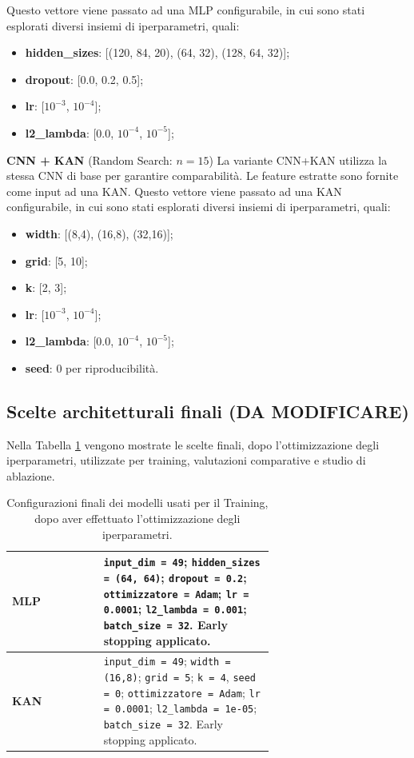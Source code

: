 \documentclass[a4paper,12pt]{report}
\begin{document}
	Questo vettore viene passato ad una MLP configurabile, in cui sono stati esplorati diversi insiemi di iperparametri, quali:  
	\begin{itemize}
		\item \textbf{hidden\_sizes}: [(120, 84, 20), (64, 32), (128, 64, 32)];
		\item \textbf{dropout}: [0.0, 0.2, 0.5];
		\item \textbf{lr}: [$10^{-3}$, $10^{-4}$];
		\item \textbf{l2\_lambda}: [0.0, $10^{-4}$, $10^{-5}$];
	\end{itemize}
	
	\smallskip
	\noindent\textbf{CNN + KAN} \quad (Random Search: $n=15$)  
	La variante CNN+KAN utilizza la stessa CNN di base per garantire comparabilità. Le feature estratte sono fornite come input ad una KAN. Questo vettore viene passato ad una KAN configurabile, in cui sono stati esplorati diversi insiemi di iperparametri, quali: 
	\begin{itemize}
		\item \textbf{width}: [(8,4), (16,8), (32,16)];
		\item \textbf{grid}: [5, 10];
		\item \textbf{k}: [2, 3];
		\item \textbf{lr}: [$10^{-3}$, $10^{-4}$];
		\item \textbf{l2\_lambda}: [0.0, $10^{-4}$, $10^{-5}$];
		\item \textbf{seed}: 0 per riproducibilità.
	\end{itemize}
	
	\subsection{Scelte architetturali finali (DA MODIFICARE)}
	Nella Tabella \ref{tab:model-config-image} vengono mostrate le scelte finali, dopo l'ottimizzazione degli iperparametri, utilizzate per training, valutazioni comparative e studio di ablazione.
	
	\begin{table}[H]
		\centering
		\caption{Configurazioni finali dei modelli usati per il Training, dopo aver effettuato l'ottimizzazione degli iperparametri.}
		\label{tab:model-config-image}
		\begin{tabular}{l p{0.65\linewidth}}
			\toprule
			\textbf{MLP} & \texttt{input\_dim = 49}; \texttt{hidden\_sizes = (64, 64)}; \texttt{dropout = 0.2}; \texttt{ottimizzatore = Adam}; \texttt{lr = 0.0001}; \texttt{l2\_lambda = 0.001}; \texttt{batch\_size = 32}. Early stopping applicato. \\
			\midrule
			\textbf{KAN} & \texttt{input\_dim = 49}; \texttt{width = (16,8)}; \texttt{grid = 5}; \texttt{k = 4}, \texttt{seed = 0}; \texttt{ottimizzatore = Adam}; \texttt{lr = 0.0001}; \texttt{l2\_lambda = 1e-05}; \texttt{batch\_size = 32}. Early stopping applicato. \\
			\bottomrule
		\end{tabular}
	\end{table}
	
\end{document}
